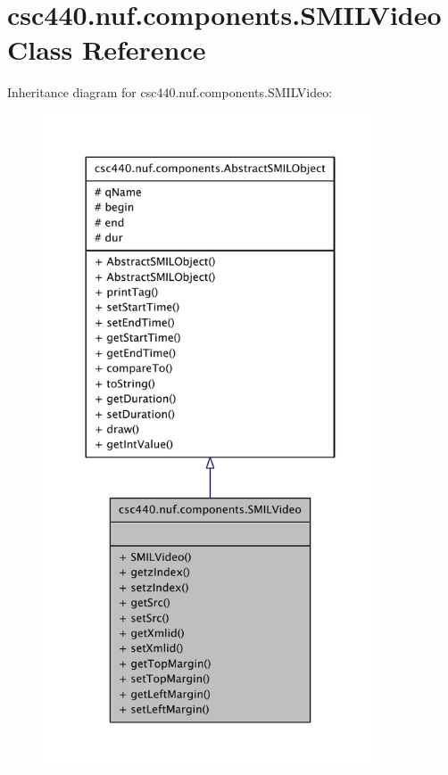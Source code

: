 \hypertarget{classcsc440_1_1nuf_1_1components_1_1_s_m_i_l_video}{\section{csc440.\-nuf.\-components.\-S\-M\-I\-L\-Video Class Reference}
\label{classcsc440_1_1nuf_1_1components_1_1_s_m_i_l_video}
}


Inheritance diagram for csc440.\-nuf.\-components.\-S\-M\-I\-L\-Video\-:
\nopagebreak
\begin{figure}[H]
\begin{center}
\leavevmode
\includegraphics[height=550pt]{classcsc440_1_1nuf_1_1components_1_1_s_m_i_l_video__inherit__graph}
\end{center}
\end{figure}


